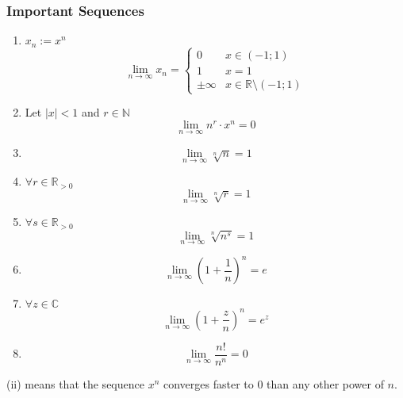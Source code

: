 \subsubsection{Important Sequences}
\begin{proposition}
   \begin{enumerate}[label=\roman*, align=Center]
      \item \(x_n := x^n\)
         \[\lim_{n \to \infty} x_n = \begin{cases}
               0 & x \in (-1; 1)\\
               1 & x = 1\\
               \pm\infty & x \in \mathbb{R}\setminus (-1;1)
         \end{cases}\]
      \item Let \(|x| < 1\) and \(r \in \mathbb{N}\)
         \[\lim_{n \to \infty} n^r \cdot x^n = 0\]
      \item \[\lim_{n \to \infty} \sqrt[n]{n} = 1\]
      \item \(\forall r \in \mathbb{R}_{>0}\)
         \[\lim_{n \to \infty} \sqrt[n]{r} = 1\]
      \item \(\forall s \in \mathbb{R}_{>0}\)
         \[\lim_{n \to \infty} \sqrt[n]{n^s} = 1\]
      \item
         \[\lim_{n \to \infty} \left(1 + \frac{1}{n}\right)^n = e\]
      \item \(\forall z \in \mathbb{C}\)
         \[\lim_{n \to \infty} \left(1 + \frac{z}{n}\right)^n = e^z\]
      \item
         \[\lim_{n \to \infty} \frac{n!}{n^n} = 0\]
   \end{enumerate}
\end{proposition}
\begin{remark}
   (ii) means that the sequence \(x^n\) converges faster to 0 than any other power of \(n\).
\end{remark}
